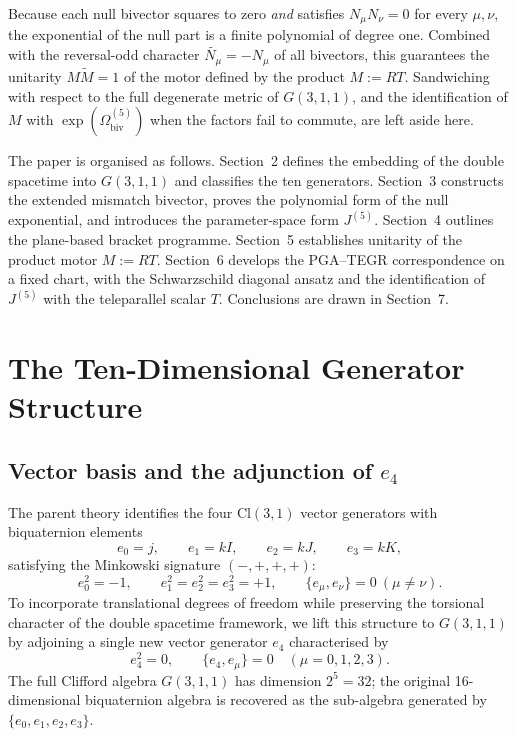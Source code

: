 \documentclass[dvipdfmx,a4paper]{article}
\theoremstyle{definition}
\theoremstyle{plain}
\theoremstyle{remark}
\begin{document}
Because each null bivector squares to zero \emph{and} satisfies \(N_{\mu}N_{\nu}=0\) for every \(\mu,\nu\), the exponential of the null part is a finite polynomial of degree one. Combined with the reversal-odd character \(\widetilde{N_{\mu}}=-N_{\mu}\) of all bivectors, this guarantees the unitarity \(M\widetilde{M}=1\) of the motor defined by the product \(M:=RT\). Sandwiching with respect to the full degenerate metric of \(G(3,1,1)\), and the identification of \(M\) with \(\exp(\Omega_{\mathrm{biv}}^{(5)})\) when the factors fail to commute, are left aside here.

The paper is organised as follows. Section~2 defines the embedding of the double spacetime into \(G(3,1,1)\) and classifies the ten generators. Section~3 constructs the extended mismatch bivector, proves the polynomial form of the null exponential, and introduces the parameter-space form \(J^{(5)}\). Section~4 outlines the plane-based bracket programme. Section~5 establishes unitarity of the product motor \(M:=RT\). Section~6 develops the PGA--TEGR correspondence on a fixed chart, with the Schwarzschild diagonal ansatz and the identification of \(J^{(5)}\) with the teleparallel scalar \(T\). Conclusions are drawn in Section~7.

\section{The Ten-Dimensional Generator Structure}

\subsection{Vector basis and the adjunction of \(e_{4}\)}

The parent theory identifies the four \(\mathrm{Cl}(3,1)\) vector generators with biquaternion elements
\[
e_{0}=j,\qquad e_{1}=kI,\qquad e_{2}=kJ,\qquad e_{3}=kK,
\]
satisfying the Minkowski signature \((-,+,+,+)\):
\[
e_{0}^{2}=-1,\qquad e_{1}^{2}=e_{2}^{2}=e_{3}^{2}=+1,\qquad \{e_{\mu},e_{\nu}\}=0\ (\mu\neq\nu).
\]
To incorporate translational degrees of freedom while preserving the torsional character of the double spacetime framework, we lift this structure to \(G(3,1,1)\) by adjoining a single new vector generator \(e_{4}\) characterised by
\begin{equation}
e_{4}^{2}=0,\qquad \{e_{4},e_{\mu}\}=0\quad (\mu=0,1,2,3).
\label{eq:e4-defs}
\end{equation}
The full Clifford algebra \(G(3,1,1)\) has dimension \(2^{5}=32\); the original 16-dimensional biquaternion algebra is recovered as the sub-algebra generated by \(\{e_{0},e_{1},e_{2},e_{3}\}\).
\end{document}

